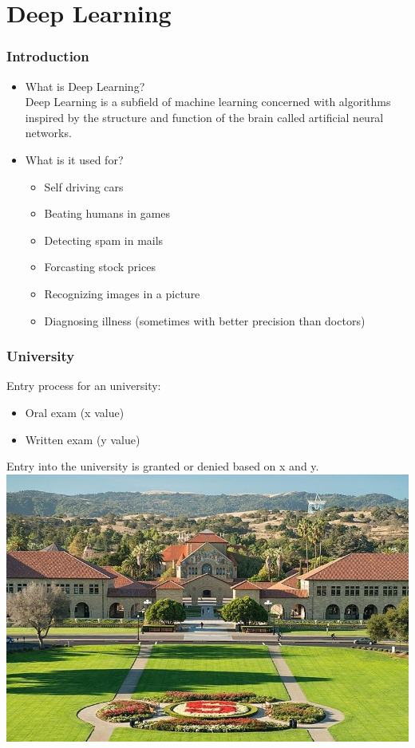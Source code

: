 \section{Deep Learning}

\begin{frame}[fragile]
  \frametitle{Introduction}
  \begin{itemize}
  \item What is Deep Learning?\\
  Deep Learning is a subfield of machine learning concerned with algorithms inspired by the structure and function of the brain called artificial neural networks.
  \item What is it used for?
  \begin{itemize}
  \item Self driving cars
  \item Beating humans in games
  \item Detecting spam in mails
  \item Forcasting stock prices
  \item Recognizing images in a picture
  \item Diagnosing illness (sometimes with better precision than doctors)
  \end{itemize}
  \end{itemize}
\end{frame}

\begin{frame}[fragile]
  \frametitle{University}
  Entry process for an university:
  \begin{itemize}
  \item Oral exam (x value)
  \item Written exam (y value)
  \end{itemize}
  Entry into the university is granted or denied based on x and y.\\
  \vspace{3mm}
  \includegraphics[scale=0.2]{img/stanford}
\end{frame}

